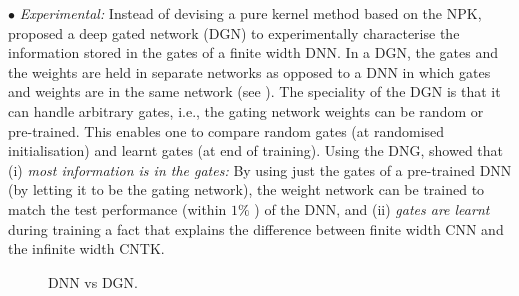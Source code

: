 $\bullet$ \emph{Experimental:} Instead of devising a pure kernel method based on the NPK, \citet{npk} proposed a deep gated network (DGN) to experimentally characterise the information stored in the gates of a finite width DNN. In a DGN, the gates and the weights are held in separate networks as opposed to a DNN in which gates and weights are in the same network (see ). The speciality of the DGN is that it can handle arbitrary gates, i.e., the gating network weights can be random or pre-trained. This enables one to compare random gates (at randomised initialisation) and learnt gates (at end of training). Using the DNG, \citet{npk} showed that (i)  \emph{most information is in the gates:} By using just the gates of a pre-trained DNN (by letting it to be the gating network), the weight network can be trained to match the test performance (within $1\%$ ) of the DNN, and (ii) \emph{gates are learnt} during training a fact that explains the difference between finite width CNN and the infinite width CNTK.  
\FloatBarrier
\begin{figure}[h]
\centering
{}
\caption{DNN vs DGN.}
\label{fig:dgn}
\end{figure}
